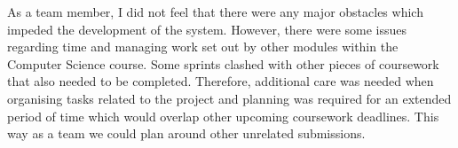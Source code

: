 As a team member, I did not feel that there were any major obstacles which impeded the development of the system. However, there were some issues regarding time and managing work set out by other modules within the Computer Science course. Some sprints clashed with other pieces of coursework that also needed to be completed. Therefore, additional care was needed when organising tasks related to the project and planning was required for an extended period of time which would overlap other upcoming coursework deadlines. This way as a team we could plan around other unrelated submissions.
